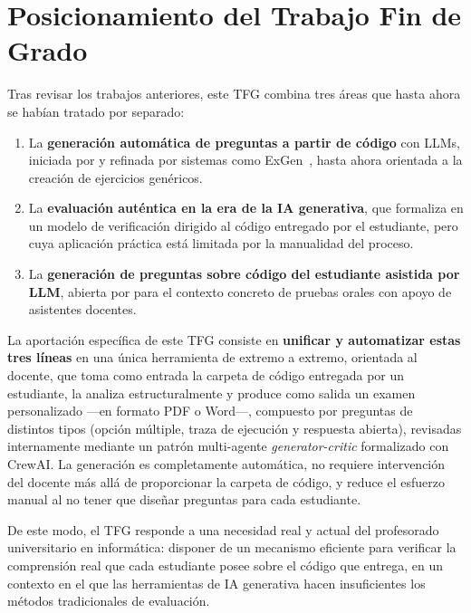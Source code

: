 \section{Posicionamiento del Trabajo Fin de Grado}
\label{sec:posicionamiento}

Tras revisar los trabajos anteriores, este TFG combina tres áreas que
hasta ahora se habían tratado por separado:

\begin{enumerate}
  \item La \textbf{generación automática de preguntas a partir de
        código} con LLMs, iniciada por \textcite{sarsa2022autogen} y
        refinada por sistemas como ExGen~\parencite{ta2026exgen}, hasta
        ahora orientada a la creación de ejercicios genéricos.
  \item La \textbf{evaluación auténtica en la era de la IA generativa},
        que \textcite{chung2026openai} formaliza en un modelo de
        verificación dirigido al código entregado por el estudiante,
        pero cuya aplicación práctica está limitada por la manualidad
        del proceso.
  \item La \textbf{generación de preguntas sobre código del estudiante
        asistida por LLM}, abierta por \textcite{anishka2024tamigo}
        para el contexto concreto de pruebas orales con apoyo de
        asistentes docentes.
\end{enumerate}

La aportación específica de este TFG consiste en \textbf{unificar y
automatizar estas tres líneas} en una única herramienta de extremo a
extremo, orientada al docente, que toma como entrada la carpeta de
código entregada por un estudiante, la analiza estructuralmente y
produce como salida un examen personalizado ---en formato PDF o Word---,
compuesto por preguntas de distintos tipos (opción múltiple, traza de
ejecución y respuesta abierta), revisadas internamente mediante
un patrón multi-agente \emph{generator-critic} formalizado con
CrewAI. La generación es completamente automática, no requiere
intervención del docente más allá de proporcionar la carpeta de
código, y reduce el esfuerzo manual al no tener que diseñar preguntas
para cada estudiante.

De este modo, el TFG responde a una necesidad real y actual del
profesorado universitario en informática: disponer de un mecanismo
eficiente para verificar la comprensión real que cada estudiante posee
sobre el código que entrega, en un contexto en el que las herramientas
de IA generativa hacen insuficientes los métodos tradicionales de
evaluación.
